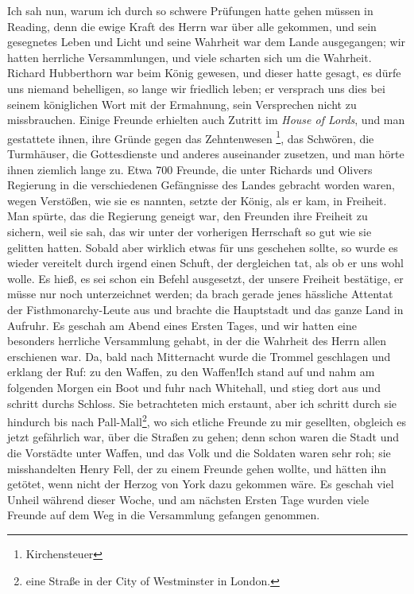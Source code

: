 Ich sah nun, warum ich durch so schwere Prüfungen hatte
gehen müssen in Reading, denn die ewige Kraft des Herrn war
über alle gekommen, und sein gesegnetes Leben und Licht und
seine Wahrheit war dem Lande ausgegangen; wir hatten herrliche 
Versammlungen, und viele scharten sich um die Wahrheit.
Richard Hubberthorn war beim König gewesen, und dieser hatte
gesagt, es dürfe uns niemand behelligen, so lange wir friedlich
leben; er versprach uns dies bei seinem königlichen Wort mit der
Ermahnung, sein Versprechen nicht zu missbrauchen. Einige
Freunde erhielten auch Zutritt im \textit{House of Lords}, und man
gestattete ihnen, ihre Gründe gegen das Zehntenwesen \footnote{Kirchensteuer}, 
das Schwören, die Turmhäuser, die Gottesdienste und anderes 
auseinander zusetzen, und man hörte ihnen ziemlich lange zu. Etwa 700 Freunde,
die unter Richards und Olivers Regierung in die verschiedenen
Gefängnisse des Landes gebracht worden waren, wegen Verstößen,
wie sie es nannten, setzte der König, als er kam, in Freiheit.
Man spürte, das die Regierung geneigt war, den Freunden ihre
Freiheit zu sichern, weil sie sah, das wir unter der vorherigen
Herrschaft so gut wie sie gelitten hatten. Sobald aber wirklich
etwas für uns geschehen sollte, so wurde es wieder vereitelt durch
irgend einen Schuft, der dergleichen tat, als ob er uns wohl
wolle. Es hieß, es sei schon ein Befehl ausgesetzt, der unsere
Freiheit bestätige, er müsse nur noch unterzeichnet werden; da
brach gerade jenes hässliche Attentat der Fisthmonarchy-Leute
aus und brachte die Hauptstadt und das ganze Land in Aufruhr.
Es geschah am Abend eines Ersten Tages, und wir hatten eine
besonders herrliche Versammlung gehabt, in der die Wahrheit
des Herrn allen erschienen war. Da, bald nach Mitternacht wurde
die Trommel geschlagen und erklang der Ruf: \glqq zu den Waffen,
zu den Waffen!\grqq Ich stand auf und nahm am folgenden Morgen
ein Boot und fuhr nach Whitehall, und stieg dort aus und schritt
durchs Schloss. Sie betrachteten mich erstaunt, aber ich schritt
durch sie hindurch bis nach Pall-Mall\footnote{eine Straße in der 
City of Westminster in London.}, wo sich etliche Freunde
zu mir gesellten, obgleich es jetzt gefährlich war, über die Straßen
zu gehen; denn schon waren die Stadt und die Vorstädte unter
Waffen, und das Volk und die Soldaten waren sehr roh; sie 
misshandelten Henry Fell, der zu einem Freunde gehen wollte, und
hätten ihn getötet, wenn nicht der Herzog von York dazu gekommen
wäre. Es geschah viel Unheil während dieser Woche, und am
nächsten Ersten Tage wurden viele Freunde auf dem Weg in die
Versammlung gefangen genommen.

